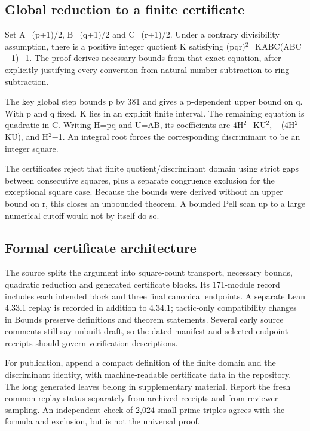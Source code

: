\documentclass[11pt,a4paper]{article}
\begin{document}
\subsection{Global reduction to a finite certificate}
Set A=(p+1)/2, B=(q+1)/2 and C=(r+1)/2. Under a contrary divisibility assumption, there is a positive integer quotient K satisfying (pqr)\ensuremath{^2}=KABC(ABC\ensuremath{-}1)+1. The proof derives necessary bounds from that exact equation, after explicitly justifying every conversion from natural-number subtraction to ring subtraction.

The key global step bounds p by 381 and gives a p-dependent upper bound on q. With p and q fixed, K lies in an explicit finite interval. The remaining equation is quadratic in C. Writing H=pq and U=AB, its coefficients are 4H\ensuremath{^2}\ensuremath{-}KU\ensuremath{^2}, \ensuremath{-}(4H\ensuremath{^2}\ensuremath{-}KU), and H\ensuremath{^2}\ensuremath{-}1. An integral root forces the corresponding discriminant to be an integer square.

The certificates reject that finite quotient/discriminant domain using strict gaps between consecutive squares, plus a separate congruence exclusion for the exceptional square case. Because the bounds were derived without an upper bound on r, this closes an unbounded theorem. A bounded Pell scan up to a large numerical cutoff would not by itself do so.

\subsection{Formal certificate architecture}
The source splits the argument into square-count transport, necessary bounds, quadratic reduction and generated certificate blocks. Its 171-module record includes each intended block and three final canonical endpoints. A separate Lean 4.33.1 replay is recorded in addition to 4.34.1; tactic-only compatibility changes in Bounds preserve definitions and theorem statements. Several early source comments still say unbuilt draft, so the dated manifest and selected endpoint receipts should govern verification descriptions.

For publication, append a compact definition of the finite domain and the discriminant identity, with machine-readable certificate data in the repository. The long generated leaves belong in supplementary material. Report the fresh common replay status separately from archived receipts and from reviewer sampling. An independent check of 2,024 small prime triples agrees with the formula and exclusion, but is not the universal proof.
\end{document}
